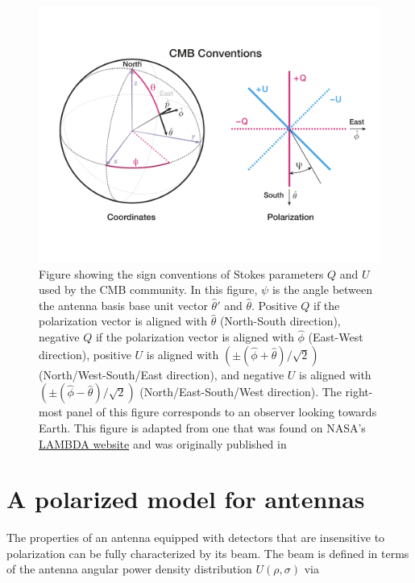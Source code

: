 \documentclass[a4paper,11pt]{article}
\begin{document}
\begin{figure}
	\centering
	\includegraphics[width=1.0\linewidth]{figures/cmb_coord_convention}
	\caption{Figure showing the sign conventions of Stokes parameters $Q$ and $U$ used by the CMB community. In this figure, $\psi$ is the angle between the antenna basis base unit vector $\hat{\theta}'$ and $\hat{\theta}$. Positive $Q$ if the polarization vector is aligned with $\hat{\theta}$ (North-South direction), negative $Q$ if the polarization vector is aligned with $\hat{\phi}$ (East-West direction), positive $U$ is aligned with $(\pm(\hat{\phi} + \hat{\theta})/\sqrt{2} )$ (North/West-South/East direction), and negative $U$ is aligned with $(\pm(\hat{\phi} - \hat{\theta})/\sqrt{2} )$ (North/East-South/West direction). The right-most panel of this figure corresponds to an observer looking towards Earth.  This figure is adapted from one that was found on NASA's \href{https://lambda.gsfc.nasa.gov/product/about/pol_convention.cfm}{LAMBDA website} and was originally published in \cite{healpixDocs}}
	\label{fig::cmbcoordconvention}
\end{figure}

\section{A polarized model for antennas}
\label{sec::antennas}

The properties of an antenna equipped with detectors that are insensitive to polarization can be fully characterized by its beam. The beam is defined in terms of the antenna angular power density distribution $U(\rho,\sigma)$ via
\end{document}
